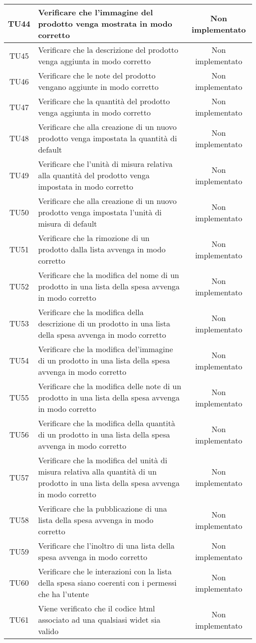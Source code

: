 \begin{center}
\begin{longtable}{|c|>{\centering}m{10cm}|c|}
		TU44 & Verificare che l'immagine del prodotto venga mostrata in modo corretto & Non implementato \\ \hline
		TU45 & Verificare che la descrizione del prodotto venga aggiunta in modo corretto & Non implementato \\ \hline
		TU46 & Verificare che le note del prodotto vengano aggiunte in modo corretto & Non implementato \\ \hline
		TU47 & Verificare che la quantità del prodotto venga aggiunta in modo corretto & Non implementato \\ \hline
		TU48 & Verificare che alla creazione di un nuovo prodotto venga impostata la quantità di default & Non implementato \\ \hline
		TU49 & Verificare che l'unità di misura relativa alla quantità del prodotto venga impostata in modo corretto & Non implementato \\ \hline
		TU50 & Verificare che alla creazione di un nuovo prodotto venga impostata l'unità di misura di default & Non implementato \\ \hline
		TU51 & Verificare che la rimozione di un prodotto dalla lista avvenga in modo corretto & Non implementato \\ \hline
		TU52 & Verificare che la modifica del nome di un prodotto in una lista della spesa avvenga in modo corretto & Non implementato \\ \hline
		TU53 & Verificare che la modifica della descrizione di un prodotto in una lista della spesa avvenga in modo corretto & Non implementato \\ \hline
		TU54 & Verificare che la modifica del'immagine di un prodotto in una lista della spesa avvenga in modo corretto & Non implementato \\ \hline
		TU55 & Verificare che la modifica delle note di un prodotto in una lista della spesa avvenga in modo corretto & Non implementato \\ \hline
		TU56 & Verificare che la modifica della quantità di un prodotto in una lista della spesa avvenga in modo corretto & Non implementato \\ \hline
		TU57 & Verificare che la modifica del unità di misura relativa alla quantità di un prodotto in una lista della spesa avvenga in modo corretto & Non implementato \\ \hline
		TU58 & Verificare che la pubblicazione di una lista della spesa avvenga in modo corretto & Non implementato \\ \hline
		TU59 & Verificare che l'inoltro di una lista della spesa avvenga in modo corretto & Non implementato \\ \hline
		TU60 & Verificare che le interazioni con la lista della spesa siano coerenti con i permessi che ha l'utente & Non implementato \\ \hline
		TU61 & Viene verificato che il codice html associato ad una qualsiasi widet sia valido & Non implementato \\ \hline
	\end{longtable}
\end{center}
